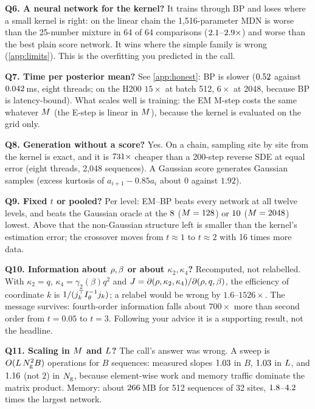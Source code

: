 \documentclass[11pt,a4paper]{article}
\begin{document}
\textbf{Q6. A neural network for the kernel?} It trains through BP and loses where a small kernel is right: on the linear chain
the 1{,}516-parameter MDN is worse than the 25-number mixture in 64 of 64 comparisons ($2.1$--$2.9\times$)
and worse than the best plain score network.  It wins where the simple family is
wrong (\ref{app:limits}). This is the overfitting you predicted in the call.

\textbf{Q7. Time per posterior mean?} See \ref{app:honest}: BP is slower ($0.52$ against
$0.042$\,ms, eight threads; on the H200 $15\times$ at batch 512, $6\times$ at 2048, because BP is latency-bound).
What scales well is training: the EM M-step costs the same whatever $M$ (the E-step is linear in $M$), because the kernel
is evaluated on the grid only.

\textbf{Q8. Generation without a score?} Yes. On a chain, sampling site by site from the kernel is exact, and it is
$731\times$ cheaper than a 200-step reverse SDE at equal error (eight threads, 2{,}048 sequences). A Gaussian
score generates Gaussian samples (excess kurtosis of $a_{i+1}-0.85a_i$ about $0$ against $1.92$).

\textbf{Q9. Fixed $t$ or pooled?} Per level: EM--BP beats every network at all twelve levels, and beats the Gaussian oracle at
the $8$ ($M=128$) or $10$ ($M=2048$) lowest. Above that the non-Gaussian structure left is
smaller than the kernel's estimation error; the crossover moves from $t\approx1$ to $t\approx2$ with 16 times more data.

\textbf{Q10. Information about $\rho,\beta$ or about $\kappa_2,\kappa_4$?} Recomputed, not relabelled. With $\kappa_2=q$,
$\kappa_4=\gamma_2(\beta)q^2$ and $J=\partial(\rho,\kappa_2,\kappa_4)/\partial(\rho,q,\beta)$, the efficiency of coordinate $k$ is
$1/(j_k^\top I_\theta^{-1}j_k)$; a relabel would be wrong by $1.6$--$1526\times$. The message survives: fourth-order information
falls about $700\times$ more than second order from $t=0.05$ to $t=3$. Following your advice it is a supporting result, not
the headline.

\textbf{Q11. Scaling in $M$ and $L$?} The call's answer was wrong. A sweep is $O(L\,N_{\mathrm{g}}^2 B)$ operations for $B$
sequences: measured slopes $1.03$ in $B$, $1.03$ in $L$, and $1.16$ (not $2$) in $N_{\mathrm{g}}$,
because element-wise work and memory traffic dominate the matrix product. Memory: about $266$\,MB for 512 sequences of 32
sites, $1.8$--$4.2$ times the largest network.
\end{document}
